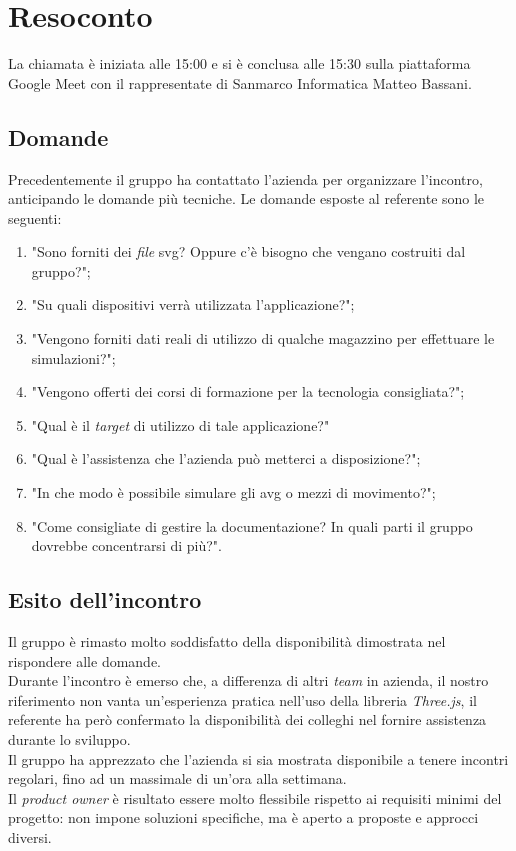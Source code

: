 \section{Resoconto}
La chiamata è iniziata alle 15:00 e si è conclusa alle 15:30 sulla piattaforma Google Meet con il rappresentate di Sanmarco Informatica Matteo Bassani.
\subsection{Domande}
Precedentemente il gruppo ha contattato l'azienda per organizzare l'incontro, anticipando le domande più tecniche.
Le domande esposte al referente sono le seguenti:
\begin{enumerate}
    \item "Sono forniti dei \textit{file} svg? Oppure c'è bisogno che vengano costruiti dal gruppo?";
    \item "Su quali dispositivi verrà utilizzata l'applicazione?";
    \item "Vengono forniti dati reali di utilizzo di qualche magazzino per effettuare le simulazioni?";
    \item "Vengono offerti dei corsi di formazione per la tecnologia consigliata?";
	\item "Qual è il \textit{target} di utilizzo di tale applicazione?"
    \item "Qual è l'assistenza che l'azienda può metterci a disposizione?";
    \item "In che modo è possibile simulare gli avg o mezzi di movimento?";
    \item "Come consigliate di gestire la documentazione? In quali parti il gruppo dovrebbe concentrarsi di più?".
\end{enumerate}

\subsection{Esito dell'incontro}
Il gruppo è rimasto molto soddisfatto della disponibilità dimostrata nel rispondere alle domande. \\ 
Durante l'incontro è emerso che, a differenza di altri \textit{team} in azienda, il nostro riferimento non vanta un'esperienza pratica nell'uso della libreria \textit{Three.js}, il referente ha però confermato la disponibilità dei colleghi nel fornire assistenza durante lo sviluppo. \\
Il gruppo ha apprezzato che l'azienda si sia mostrata disponibile a tenere incontri regolari, fino ad un massimale di un'ora alla settimana. \\
Il \textit{product owner} è risultato essere molto flessibile rispetto ai requisiti minimi del progetto: non impone soluzioni specifiche, ma è aperto a proposte e approcci diversi. \\


